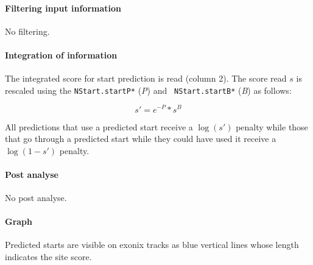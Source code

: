 \paragraph{Filtering input information}

No filtering.

\paragraph{Integration of information}

The integrated score for start prediction is read (column 2).  The
score read $s$ is rescaled using the {\tt NStart.startP*} (\emph{P}) and {\tt
NStart.startB*} (\emph{B}) as follows:

\[s' = e^{-P}*s^B\]

All predictions that use a predicted start receive a $\log(s')$
penalty while those that go through a predicted start while they
could have used it receive a $\log(1-s')$ penalty.


\paragraph{Post analyse}

No post analyse.

\paragraph{Graph}

Predicted starts are visible on exonix tracks as blue vertical lines
whose length indicates the site score.





